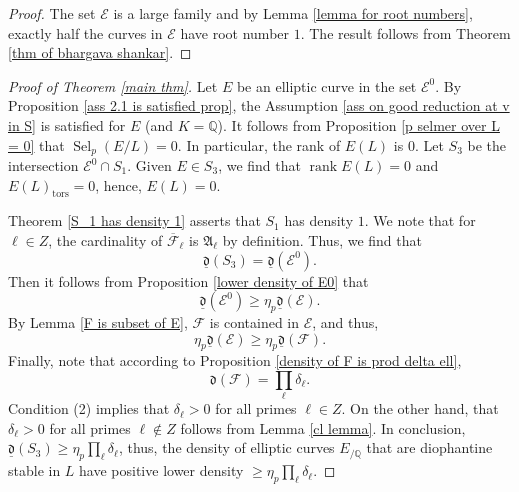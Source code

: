 \documentclass[12pt]{amsart}
\newcommand{\cF}{\mathcal{F}}
\newcommand{\cE}{\mathcal{E}}
\newcommand{\Q}{\mathbb{Q}}
\newcommand{\op}[1]{\operatorname{#1}}
\numberwithin{equation}{section}
\begin{document}
\begin{proof}
    The set $\cE$ is a large family and by Lemma \ref{lemma for root numbers}, exactly half the curves in $\cE$ have root number $1$. The result follows from Theorem \ref{thm of bhargava shankar}. 
\end{proof}




\begin{proof}[Proof of Theorem \ref{main thm}]
    \par Let $E$ be an elliptic curve in the set $\cE^0$. By Proposition \ref{ass 2.1 is satisfied prop}, the Assumption \ref{ass on good reduction at v in S} is satisfied for $E$ (and $K=\Q$). It follows from Proposition \ref{p selmer over L = 0} that $\op{Sel}_p(E/L)=0$. In particular, the rank of $E(L)$ is $0$. Let $S_3$ be the intersection $\cE^0\cap S_1$. Given $E\in S_3$, we find that $\op{rank}E(L)=0$ and $E(L)_{\op{tors}}=0$, hence, $E(L)=0$.
    
    \par Theorem \ref{S_1 has density 1} asserts that $S_1$ has density $1$.  We note that for $\ell\in Z$, the cardinality of $\overline{\cF}_\ell$ is $\mathfrak{A}_\ell$ by definition. Thus, we find that 
    \[\underline{\mathfrak{d}}(S_3)=\underline{\mathfrak{d}}(\cE^0).\]
    Then it follows from Proposition \ref{lower density of E0} that
    \[\underline{\mathfrak{d}}(\cE^0)\geq \eta_p \underline{\mathfrak{d}}(\cE).\]
    By Lemma \ref{F is subset of E}, $\cF$ is contained in $\cE$, and thus,
    \[ \eta_p \underline{\mathfrak{d}}(\cE)\geq \eta_p \underline{\mathfrak{d}}(\cF).\]
    Finally, note that according to  Proposition \ref{density of F is prod delta ell}, 
\[\mathfrak{d}(\cF)=\prod_\ell \delta_\ell.\]
Condition (2) implies that $\delta_\ell>0$ for all primes $\ell\in Z$. On the other hand, that $\delta_\ell>0$ for all primes $\ell\notin Z$ follows from  Lemma \ref{cl lemma}.
In conclusion, $\underline{\mathfrak{d}}(S_3) \geq \eta_p \prod_\ell \delta_\ell$, thus, the density of elliptic curves $E_{/\Q}$ that are diophantine stable in $L$ have positive lower density $\geq \eta_p \prod_\ell \delta_\ell$.
\end{proof}
\end{document}
